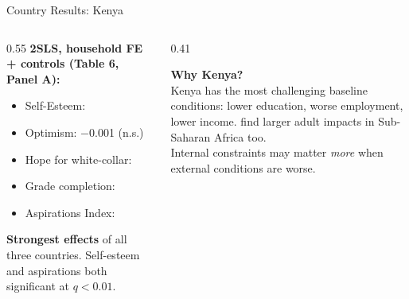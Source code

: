 \documentclass[aspectratio=169, 10pt]{beamer}
\begin{document}
\begin{frame}{Country Results: Kenya}
  \begin{columns}
    \begin{column}{0.55\textwidth}
      \textbf{2SLS, household FE + controls (Table 6, Panel A):}
      \begin{itemize}
        \item Self-Esteem: 
        \item Optimism: $-$0.001 (n.s.)
        \item Hope for white-collar: 
        \item Grade completion: 
        \item Aspirations Index: 
      \end{itemize}
      \vspace{0.4em}
      \textbf{Strongest effects} of all three countries. Self-esteem and aspirations both significant at $q < 0.01$.
    \end{column}
    \begin{column}{0.41\textwidth}
      \begin{keybox}
        \textbf{Why Kenya?}\\[0.4em]
        Kenya has the most challenging baseline conditions: lower education, worse employment, lower income. \citealt{Wydick2013} find larger adult impacts in Sub-Saharan Africa too.\\[0.4em]
        Internal constraints may matter \emph{more} when external conditions are worse.
      \end{keybox}
    \end{column}
  \end{columns}
\end{frame}
\end{document}
